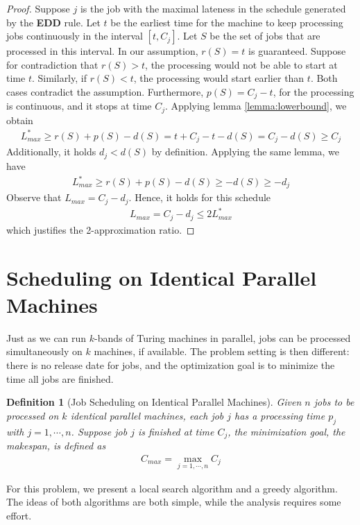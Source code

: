 \documentclass[11pt,psfig,times]{article}
\newtheorem{definition}[theorem]{Definition}
\begin{document}
\begin{proof}
    Suppose $j$ is the job with the maximal lateness in the schedule generated by the \textbf{EDD} rule.
    Let $t$ be the earliest time for the machine to keep processing jobs continuously in the interval $[t, C_j]$.
    Let $S$ be the set of jobs that are processed in this interval. In our assumption, $r(S) = t$ is guaranteed. 
    Suppose for contradiction that $r(S) > t$, the processing would not be able to start at time $t$. 
    Similarly, if $r(S) < t$, the processing would start earlier than $t$. Both cases contradict the assumption.
    Furthermore, $p(S) = C_j - t$, for the processing is continuous, and it stops at time $C_j$. Applying lemma \cref{lemma:lowerbound},
    we obtain 
    \begin{align*}
        L_{max}^* \geq r(S) + p(S) - d(S) = t + C_j - t - d(S) = C_j - d(S) \geq C_j
    \end{align*}
    Additionally, it holds $d_j < d(S)$ by definition. Applying the same lemma, we have
    \begin{align*}
        L_{max}^* \geq r(S) + p(S) - d(S) \geq -d(S) \geq -d_j
    \end{align*}
    Observe that $L_{max} = C_j - d_j$. Hence, it holds for this schedule
    \begin{align*}
        L_{max} = C_j - d_j \leq 2L_{max}^*
    \end{align*}
    which justifies the 2-approximation ratio.
\end{proof}

\section{Scheduling on Identical Parallel Machines}
Just as we can run $k$-bands of Turing machines in parallel, jobs can be processed simultaneously on 
$k$ machines, if available. The problem setting is then different: there is no release date for jobs, and 
the optimization goal is to minimize the time all jobs are finished. 
\begin{definition}[Job Scheduling on Identical Parallel Machines]
    Given $n$ jobs to be processed on $k$ identical parallel machines, each job $j$ has a processing time $p_j$ with $j = 1, \cdots, n$.
    Suppose job $j$ is finished at time $C_j$, the minimization goal, the makespan, is defined as
    \begin{align*}
        C_{max} = \max_{j = 1, \cdots, n} C_j
    \end{align*}
\end{definition}
For this problem, we present a local search algorithm and a greedy algorithm. The ideas of both algorithms 
are both simple, while the analysis requires some effort. 
\end{document}
